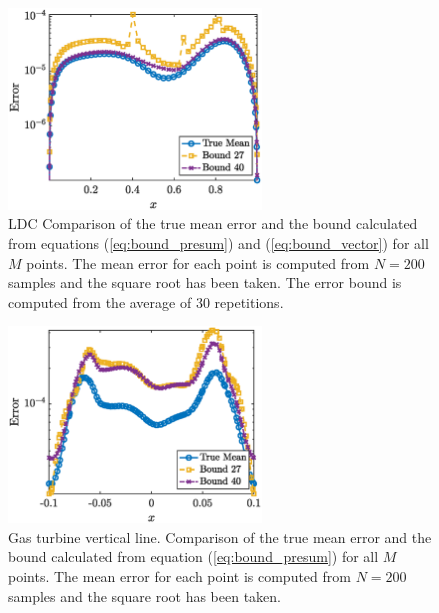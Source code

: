 \documentclass{report}
\begin{document}
% 
\begin{figure}[ht!]
\centering
\includegraphics[width =0.6\textwidth]{Figures/LDC_eq_27_bound_30reps.eps}
\caption{LDC Comparison of the true mean error and the bound calculated from equations (\ref{eq:bound_presum}) and (\ref{eq:bound_vector}) for all $M$ points. The mean error for each point is computed from $N=200$ samples and the square root has been taken. The error bound is computed from the average of $30$ repetitions.} 
\label{fig:LDC_eq_27_bound_reps}
\end{figure}
%

% 
\begin{figure}[ht!]
\centering
\includegraphics[width =0.6\textwidth]{Figures/GT_mid_eq_27_bound_30reps.eps}
\caption{Gas turbine vertical line. Comparison of the true mean error and the bound calculated from equation (\ref{eq:bound_presum}) for all $M$ points. The mean error for each point is computed from $N=200$ samples and the square root has been taken.} 
\label{fig:GT_mid_eq_27_bound_reps}
\end{figure}
%
\end{document}
